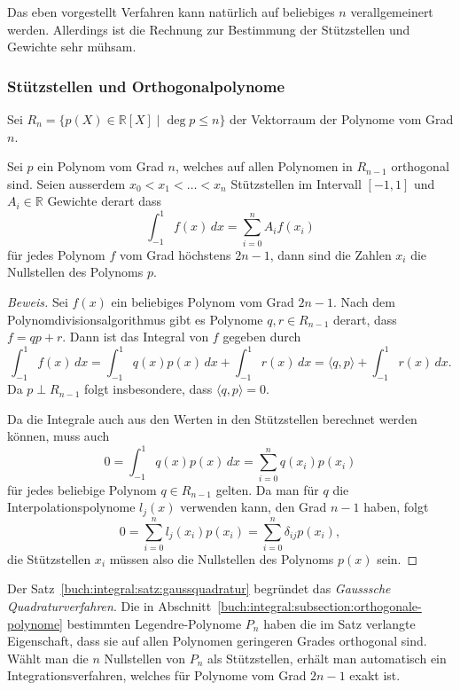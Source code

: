 Das eben vorgestellt Verfahren kann natürlich auf beliebiges $n$
verallgemeinert werden.
Allerdings ist die Rechnung zur Bestimmung der Stützstellen und
Gewichte sehr mühsam.

\subsubsection{Stützstellen und Orthogonalpolynome}
Sei $R_n=\{p(X)\in\mathbb{R}[X] \mid \deg p\le n\}$ der Vektorraum
der Polynome vom Grad $n$.

\begin{satz}
\label{buch:integral:satz:gaussquadratur}
Sei $p$ ein Polynom vom Grad $n$, welches auf allen Polynomen in $R_{n-1}$
orthogonal sind.
Seien ausserdem $x_0<x_1<\dots<x_n$ Stützstellen im Intervall $[-1,1]$ 
und $A_i\in\mathbb{R}$ Gewichte derart dass
\[
\int_{-1}^1 f(x)\,dx =
\sum_{i=0}^n A_if(x_i)
\]
für jedes Polynom $f$ vom Grad höchstens $2n-1$, dann sind die Zahlen
$x_i$ die Nullstellen des Polynoms $p$.
\end{satz}

\begin{proof}[Beweis]
Sei $f(x)$ ein beliebiges Polynom vom Grad $2n-1$.
Nach dem Polynomdivisionsalgorithmus gibt es
Polynome $q,r\in R_{n-1}$ derart, dass $f=qp+r$.
Dann ist das Integral von $f$ gegeben durch
\[
\int_{-1}^1 f(x)\,dx
=
\int_{-1}^1q(x) p(x)\,dx + \int_{-1}^1 r(x)\,dx
=
\langle q,p\rangle + \int_{-1}^1 r(x)\,dx.
\]
Da $p\perp R_{n-1}$ folgt insbesondere, dass $\langle q,p\rangle=0$.

Da die Integrale auch aus den Werten in den Stützstellen berechnet
werden können, muss auch
\[
0
=
\int_{-1}^1 q(x)p(x)\,dx
=
\sum_{i=0}^n q(x_i)p(x_i)
\]
für jedes beliebige Polynom $q\in R_{n-1}$ gelten.
Da man für $q$ die Interpolationspolynome $l_j(x)$ verwenden
kann, den Grad $n-1$ haben, folgt
\[
0
=
\sum_{i=0}^n
l_j(x_i)p(x_i)
=
\sum_{i=0}^n \delta_{ij}p(x_i),
\]
die Stützstellen $x_i$ müssen also die Nullstellen des Polynoms
$p(x)$ sein.
\end{proof}

Der Satz~\ref{buch:integral:satz:gaussquadratur} begründet das
{\em Gausssche Quadraturverfahren}.
Die in Abschnitt~\ref{buch:integral:subsection:orthogonale-polynome}
bestimmten Legendre-Polynome $P_n$ haben die im Satz
verlangte Eigenschaft,
dass sie auf allen Polynomen geringeren Grades orthogonal sind.
Wählt man die $n$ Nullstellen von $P_n$ als Stützstellen, erhält man 
automatisch ein Integrationsverfahren, welches für Polynome vom Grad
$2n-1$ exakt ist.

